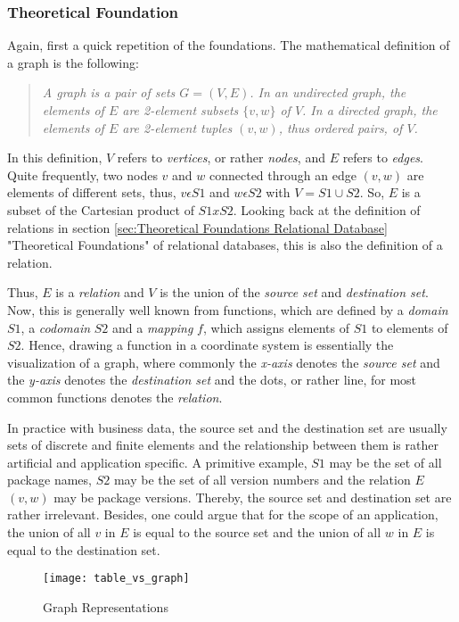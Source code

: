 \subsubsection{Theoretical Foundation}
Again, first a quick repetition of the foundations. The mathematical definition of a graph is the following: 
\begin{quote}
	\textit{A graph is a pair of sets $G = (V,E)$. In an undirected graph, the elements of $E$ are 2-element subsets $\{v,w\}$ of $V$. In a directed graph, the elements of $E$ are 2-element tuples $(v,w)$, thus ordered pairs, of $V$.}
	\cite{IntroductionToAlgorithms}
\end{quote}
In this definition, $V$ refers to \emph{vertices}, or rather \emph{nodes}, and $E$ refers to \emph{edges}. Quite frequently, two nodes $v$ and $w$ connected through an edge $(v,w)$ are elements of different sets, thus, $v \epsilon S1$ and $w \epsilon S2$ with $V = S1 \cup S2$. So, $E$ is a subset of the Cartesian product of $S1 x S2$. Looking back at the definition of relations in section \ref{sec:Theoretical Foundations Relational Database} "Theoretical Foundations" of relational databases, this is also the definition of a relation.\par
Thus, $E$ is a \emph{relation} and $V$ is the union of the \emph{source set} and \emph{destination set}. Now, this is generally well known from functions, which are defined by a \emph{domain} $S1$, a \emph{codomain} $S2$ and a \emph{mapping} $f$, which assigns elements of $S1$ to elements of $S2$. Hence, drawing a function in a coordinate system is essentially the visualization of a graph, where commonly the \emph{x-axis} denotes the \emph{source set} and the \emph{y-axis} denotes the \emph{destination set} and the dots, or rather line, for most common functions denotes the \emph{relation}.\par
In practice with business data, the source set and the destination set are usually sets of discrete and finite elements and the relationship between them is rather artificial and application specific. A primitive example, $S1$ may be the set of all package names, $S2$ may be the set of all version numbers and the relation $E$ $(v, w)$ may be package versions. Thereby, the source set and destination set are rather irrelevant. Besides, one could argue that for the scope of an application, the union of all $v$ in $E$ is equal to the source set and the union of all $w$ in $E$ is equal to the destination set.

\begin{figure}[H]
	\centering
	\texttt{[image: table\_vs\_graph]}
	\caption[graph representations]{Graph Representations }
	\label{fig:GraphTheoryExample}
\end{figure}

